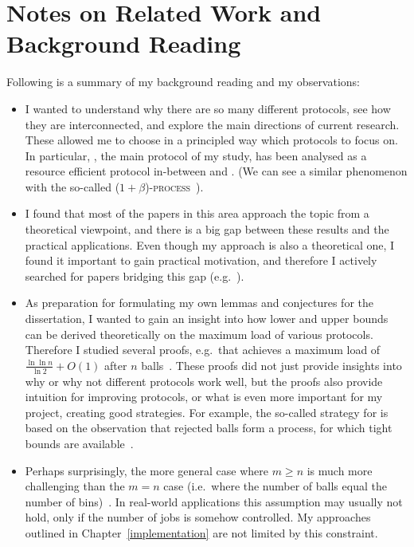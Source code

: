
\chapter{Notes on Related Work and Background Reading}\label{related-work} 

Following is a summary of my background reading and my observations:


\begin{itemize}
    \item 
    I wanted to understand why there are so many different protocols, see how they are interconnected, and explore the main directions of current research. These allowed me to choose in a principled way which protocols to focus on. In particular, \TwoThinning, the main protocol of my study, has been analysed as a resource efficient protocol in-between \OneChoice and \TwoChoice. (We can see a similar phenomenon with the so-called \textsc{($1+\beta$)-process}~\cite{peres2015oneplusbeta}).
    \item
    I found that most of the papers in this area approach the topic from a theoretical viewpoint, and there is a big gap between these results and the practical applications. Even though my approach is also a theoretical one, I found it important to gain practical motivation, and therefore I actively searched for papers bridging this gap (e.g.~\cite{wang2017twochoicerouting}).
    \item
    As preparation for formulating my own lemmas and conjectures for the dissertation, I wanted to gain an insight into how lower and upper bounds can be derived theoretically on the maximum load of various protocols. Therefore I studied several proofs, e.g.\ that \TwoChoice achieves a maximum load of $\frac{\ln\ln n}{\ln 2} + O(1)$ after $n$ balls~\cite{azar1999twochoice}. These proofs did not just provide insights into why or why not different protocols work well, but the proofs also provide intuition for improving protocols, or what is even more important for my project, creating good strategies. For example, the so-called \Threshold strategy for \TwoThinning is based on the observation that rejected balls form a \OneChoice process, for which tight bounds are available~\cite{feldheim2021thinning}.
    \item
    Perhaps surprisingly, the more general case where $m\geq n$ is much more challenging than the $m=n$ case (i.e.\ where the number of balls equal the number of bins)~\cite{berenbrink2006heavilyloaded}. In real-world applications this assumption may usually not hold, only if the number of jobs is somehow controlled. My approaches outlined in Chapter~\ref{implementation} are not limited by this constraint.

\end{itemize}
